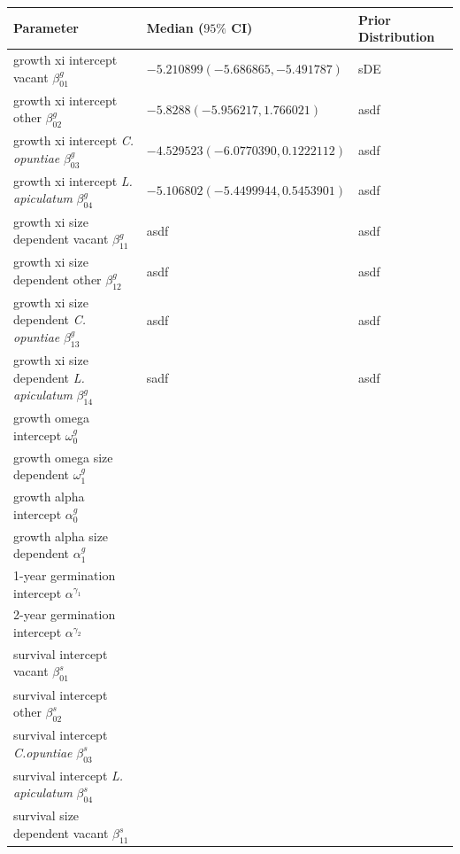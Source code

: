 \documentclass[11pt]{article}
\begin{document}
\renewcommand{\thetable}{\arabic{table}}
\setcounter{table}{0}

  \begin{table}[]
  \begin{tabular}{l|l|l}
    \textbf{Parameter} & \textbf{Median ($95\%$ CI)} & \textbf{Prior Distribution} \\
    \hline
    growth xi intercept vacant $\beta_{01}^g$ & $-5.210899 (-5.686865, -5.491787)$ & sDE\\
    growth xi intercept other $\beta_{02}^g$ & $-5.8288 (-5.956217, 1.766021) $&asdf \\
    growth xi intercept \textit{C. opuntiae} $\beta_{03}^g$ & $-4.529523 (-6.0770390, 0.1222112)$ & asdf\\
    growth xi intercept \textit{L. apiculatum} $\beta_{04}^g$ & $-5.106802 (-5.4499944, 0.5453901)$ & asdf\\
    growth xi size dependent vacant $\beta_{11}^g$ & asdf&asdf \\
    growth xi size dependent other $\beta_{12}^g$ & asdf&asdf \\
    growth xi size dependent \textit{C. opuntiae} $\beta_{13}^g$ & asdf&asdf \\
    growth xi size dependent \textit{L. apiculatum} $\beta_{14}^g$ &sadf &asdf \\
    growth omega intercept $\omega_0^g$ & & \\
    growth omega size dependent $\omega_1^g$ & & \\
    growth alpha intercept $\alpha_0^g$ & & \\
    growth alpha size dependent $\alpha_1^g$ & & \\
    \hline
    1-year germination intercept $\alpha^{\gamma_1}$ & & \\
    2-year germination intercept $\alpha^{\gamma_2}$ & & \\
    \hline
    survival intercept vacant $\beta_{01}^s$ & & \\
    survival intercept other $\beta_{02}^s$ & & \\
    survival intercept \textit{C.opuntiae} $\beta_{03}^s$ & & \\
    survival intercept \textit{L. apiculatum} $\beta_{04}^s$ & & \\
    survival size dependent vacant $\beta_{11}^s$ & & \\

\end{tabular}
\end{table}
\end{document}
